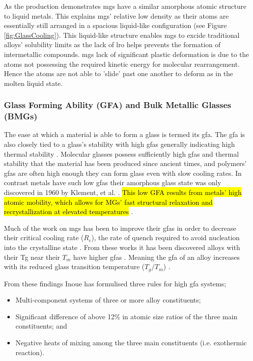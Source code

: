 \documentclass[a4paper,12pt,oneside]{report}%
\begin{document}
As the production demonstrates \glspl{mg} have a similar amorphous atomic structure to liquid metals. This explains \glspl{mg}' relative low density as their atoms are essentially still arranged in a spacious liquid-like configuration (see Figure \ref{fig:GlassCooling}). This liquid-like structure enables \glspl{mg} to excide traditional alloys' solubility limits as the lack of \gls{lro} helps prevents the formation of intermetallic compounds. \glspl{mg} lack of significant plastic deformation is due to the atoms not possessing the required kinetic energy for molecular rearrangement. Hence the atoms are not able to 'slide' past one another to deform as in the molten liquid state.

\subsubsection{Glass Forming Ability (GFA) and Bulk Metallic Glasses (BMGs)}
The ease at which a material is able to form a glass is termed its \gls{gfa}. The \gls{gfa} is also closely tied to a glass's stability with high \glspl{gfa} generally indicating high thermal stability \cite{Aji2013}. Molecular glasses possess sufficiently high \glspl{gfa} and thermal stability that the material has been produced since ancient times, and polymers' \glspl{gfa} are often high enough they can form glass even with slow cooling rates. In contrast metals have such low \glspl{gfa} their amorphous glass state was only discovered in 1960 by Klement, et al. \cite{Klement1960}. \hl{This low GFA results from metals' high atomic mobility, which allows for MGs' fast structural relaxation and recrystallization at elevated temperatures} \cite{Aji2013}. 

Much of the work on \glspl{mg} has been to improve their \glspl{gfa} in order to decrease their critical cooling rate ($R_{c}$), the rate of quench required to avoid nucleation into the crystalline state \cite{Inoue2000}. From these works it has been discovered alloys with their \gls{Tg} near their $T_{m}$ have higher \glspl{gfa} \cite{Inoue2000, Trexler2010, Turnbull1969}. Meaning the \gls{gfa} of an alloy increases with its reduced glass transition temperature ($T_{g}/T_{m}$) \cite{Inoue2000, Trexler2010, Turnbull1969}. 

From these findings Inoue \cite{Inoue2000} has formulised three rules for high \gls{gfa} systems;

\begin{itemize}
	\item Multi-component systems of three or more alloy constituents;
	\item Significant difference of above 12\% in atomic size ratios of the three main constituents; and
	\item Negative heats of mixing among the three main constituents (i.e. exothermic reaction). 
\end{itemize}
\end{document}
